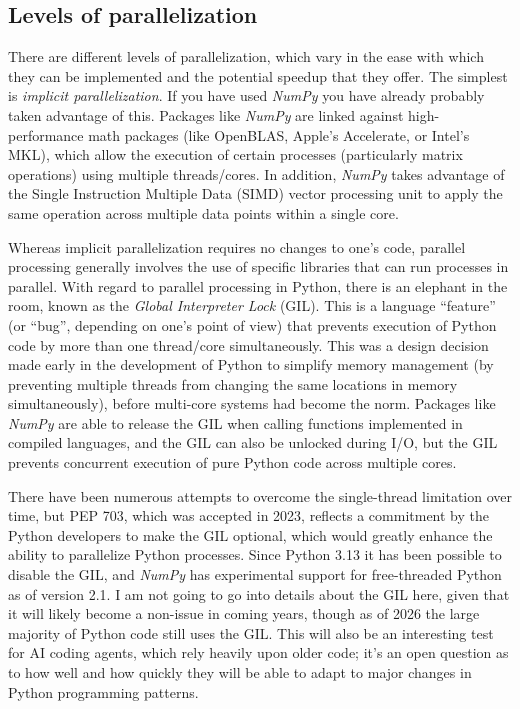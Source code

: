 \subsection{Levels of parallelization}

There are different levels of parallelization, which vary in the ease with which they can be implemented and the potential speedup that they offer. The simplest is \textit{implicit parallelization}.  If you have used \textit{NumPy} you have already probably taken advantage of this.  Packages like \textit{NumPy} are linked against high-performance math packages (like OpenBLAS, Apple's Accelerate, or Intel's MKL), which allow the execution of certain processes (particularly matrix operations) using multiple threads/cores.  In addition, \textit{NumPy} takes advantage of the Single Instruction Multiple Data (SIMD) vector processing unit to apply the same operation across multiple data points within a single core.

Whereas implicit parallelization requires no changes to one's code, parallel processing generally involves the use of specific libraries that can run processes in parallel.  With regard to parallel processing in Python, there is an elephant in the room, known as the \textit{Global Interpreter Lock} (GIL). This is a language ``feature'' (or ``bug'', depending on one's point of view) that prevents execution of Python code by more than one thread/core simultaneously.  This was a design decision made early in the development of Python to simplify memory management (by preventing multiple threads from changing the same locations in memory simultaneously), before multi-core systems had become the norm.  Packages like \textit{NumPy} are able to release the GIL when calling functions implemented in compiled languages, and the GIL can also be unlocked during I/O, but the GIL prevents concurrent execution of pure Python code across multiple cores.

There have been numerous attempts to overcome the single-thread limitation over time, but PEP 703, which was accepted in 2023, reflects a commitment by the Python developers to make the GIL optional, which would greatly enhance the ability to parallelize Python processes.  Since Python 3.13 it has been possible to disable the GIL, and \textit{NumPy} has experimental support for free-threaded Python as of version 2.1. I am not going to go into details about the GIL here, given that it will likely become a non-issue in coming years, though as of 2026 the large majority of Python code still uses the GIL.  This will also be an interesting test for AI coding agents, which rely heavily upon older code; it's an open question as to how well and how quickly they will be able to adapt to major changes in Python programming patterns.

